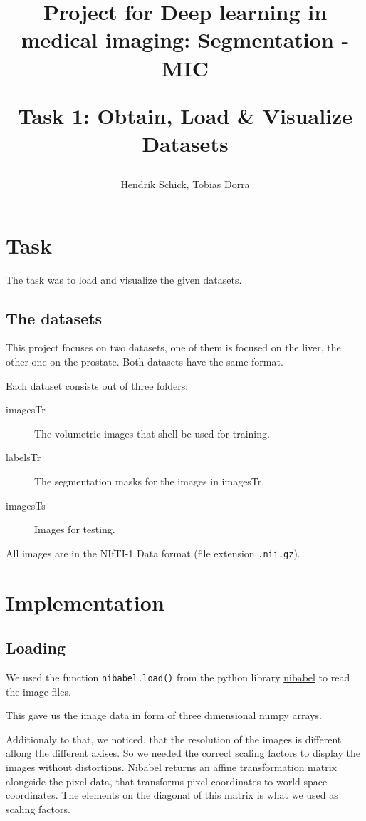 \documentclass{article}
\author{Hendrik Schick, Tobias Dorra}
\title{Project for Deep learning in medical imaging: Segmentation - MIC \\ \begin{large} 
Task 1: Obtain, Load \& Visualize Datasets
\end{large}}
\begin{document}
	
	\maketitle

	\section{Task}

		The task was to load and visualize the given datasets.

		\subsection{The datasets}

			This project focuses on two datasets, one of them is focused on the liver, the other one on the prostate. Both datasets have the same format.

			Each dataset consists out of three folders:

			\begin{description}
				\item[imagesTr] The volumetric images that shell be used for training.
				\item[labelsTr] The segmentation masks for the images in imagesTr.
				\item[imagesTs] Images for testing.
			\end{description}

			All images are in the NIfTI-1 Data format (file extension \lstinline{.nii.gz}).

	\section{Implementation}

		\subsection{Loading} \label{loading}

			We used the function \lstinline{nibabel.load()} from the python library \href{https://nipy.org/nibabel/}{nibabel} to read the image files.

			This gave us the image data in form of three dimensional numpy arrays.

			Additionaly to that, we noticed, that the resolution of the images is different allong the different axises. So we needed the correct scaling factors to display the images without distortions. Nibabel returns an affine transformation matrix alongside the pixel data, that transforms pixel-coordinates to world-space coordinates. The elements on the diagonal of this matrix is what we used as scaling factors.
\end{document}
